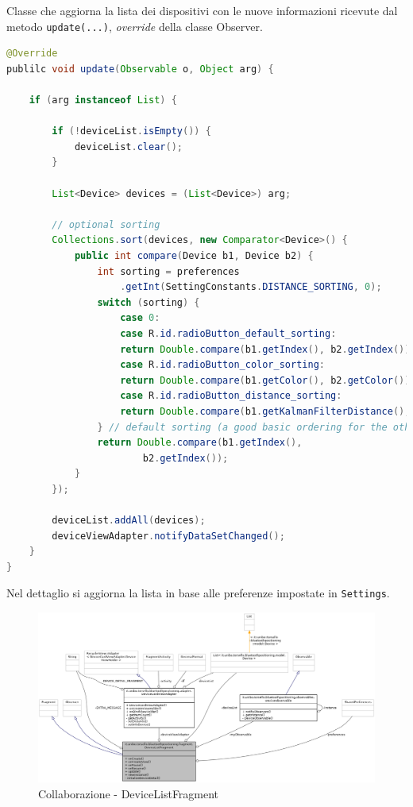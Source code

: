 Classe che aggiorna la lista dei dispositivi con le nuove informazioni ricevute dal metodo \texttt{update(...)}, \textit{override} della classe Observer.
\begin{lstlisting}[language=Java]
@Override
publilc void update(Observable o, Object arg) {
	
	if (arg instanceof List) {
		
		if (!deviceList.isEmpty()) {
			deviceList.clear();
		}
		
		List<Device> devices = (List<Device>) arg;
		
		// optional sorting
		Collections.sort(devices, new Comparator<Device>() {
			public int compare(Device b1, Device b2) {
				int sorting = preferences
					.getInt(SettingConstants.DISTANCE_SORTING, 0);
				switch (sorting) {
					case 0:
					case R.id.radioButton_default_sorting:
					return Double.compare(b1.getIndex(), b2.getIndex());
					case R.id.radioButton_color_sorting:
					return Double.compare(b1.getColor(), b2.getColor());
					case R.id.radioButton_distance_sorting:
					return Double.compare(b1.getKalmanFilterDistance(), b2.getKalmanFilterDistance());
				} // default sorting (a good basic ordering for the other options)
				return Double.compare(b1.getIndex(), 
						b2.getIndex());
			}
		});
		
		deviceList.addAll(devices);
		deviceViewAdapter.notifyDataSetChanged();
	}
}
\end{lstlisting}

Nel dettaglio si aggiorna la lista in base alle preferenze impostate in \texttt{Settings}.

\begin{figure}[ph]
	\centering
	\includegraphics[width=1.6\linewidth,angle=90]{img/uml/class/classit_1_1unibo_1_1torsello_1_1bluetoothpositioning_1_1fragment_1_1DeviceListFragment__coll__graph.png}
	\caption{Collaborazione - DeviceListFragment}
\end{figure}

